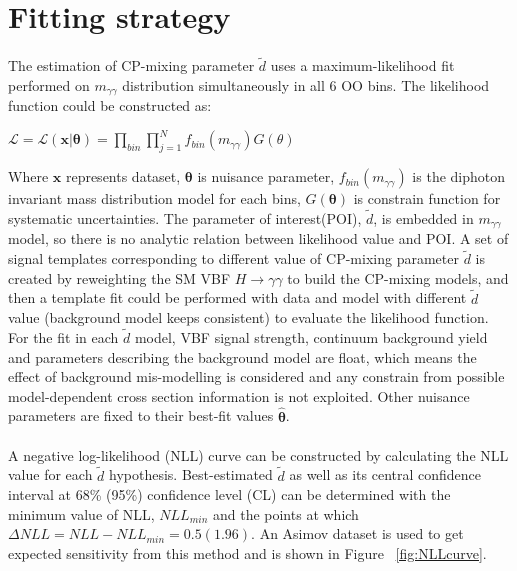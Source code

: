 \section{Fitting strategy}
\label{sec:fit}
\paragraph{} The estimation of CP-mixing parameter $\tilde{d}$ uses a maximum-likelihood fit performed on $m_{\gamma\gamma}$ distribution simultaneously in all 6 OO bins. The likelihood function could be constructed as:

\begin{center}
\begin{math}
\mathcal{L} = \mathcal{L}(\boldsymbol{x} |\boldsymbol{\theta}) = \prod_{bin}\prod_{j=1}^{N}f_{bin}(m_{\gamma\gamma})G(\theta)
\end{math}
\end{center}


Where $\boldsymbol x$ represents dataset, $\boldsymbol \theta$ is nuisance parameter, $f_{bin}(m_{\gamma\gamma})$ is the diphoton invariant mass distribution model for each bins, $G(\boldsymbol \theta)$ is constrain function for systematic uncertainties. The parameter of interest(POI), $\tilde{d}$, is embedded in $m_{\gamma\gamma}$ model, so there is no analytic relation between likelihood value and POI. A set of signal templates corresponding to different value of CP-mixing parameter $\tilde{d}$ is created by reweighting the SM VBF $H\to\gamma\gamma$ to build the CP-mixing models, and then a template fit could be performed with data and model with different $\tilde{d}$ value (background model keeps consistent) to evaluate the likelihood function. For the fit in each $\tilde{d}$ model, VBF signal strength, continuum background yield and parameters describing the background model are float, which means the effect of background mis-modelling is considered and any constrain from possible model-dependent cross section information is not exploited. Other nuisance parameters are fixed to their best-fit values $\hat{\boldsymbol \theta}$. 


\paragraph{} A negative log-likelihood (NLL) curve can be constructed by calculating the NLL value for each $\tilde{d}$ hypothesis. Best-estimated $\tilde{d}$ as well as its central confidence interval at 68\% (95\%) confidence level (CL) can be determined with the minimum value of NLL, $NLL_{min}$ and the points at which $\Delta NLL = NLL-NLL_{min} = 0.5(1.96)$. An Asimov dataset is used to get expected sensitivity from this method and is shown in Figure ~\ref{fig:NLLcurve}. 


